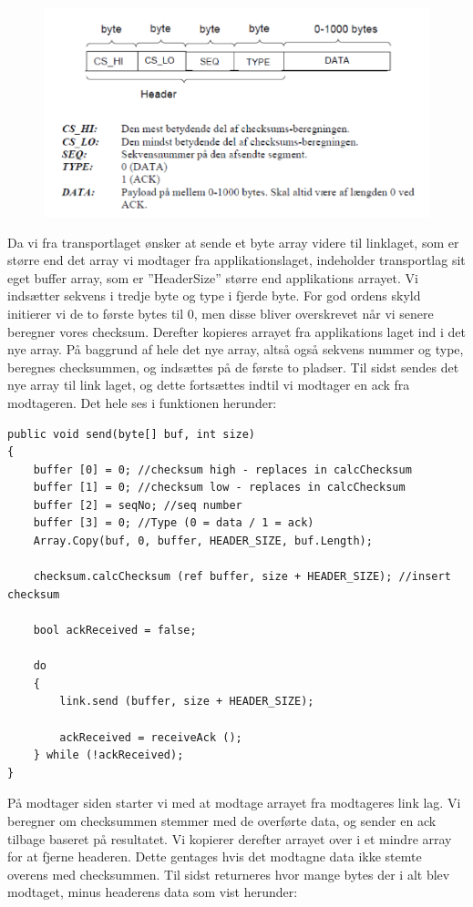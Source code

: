 \begin{figure}[h]
	\centering
	\includegraphics[width=0.7\linewidth]{figs/segment}
	\caption{}
	\label{fig:segment}
\end{figure}

Da vi fra transportlaget ønsker at sende et byte array videre til linklaget, som er større end det array vi
modtager fra applikationslaget, indeholder transportlag sit eget buffer array, som er ”HeaderSize” større
end applikations arrayet. Vi indsætter sekvens i tredje byte og type i fjerde byte. For god ordens skyld
initierer vi de to første bytes til 0, men disse bliver overskrevet når vi senere beregner vores checksum.
Derefter kopieres arrayet fra applikations laget ind i det nye array.
På baggrund af hele det nye array, altså også sekvens nummer og type, beregnes checksummen, og
indsættes på de første to pladser.
Til sidst sendes det nye array til link laget, og dette fortsættes indtil vi modtager en ack fra modtageren. Det
hele ses i funktionen herunder:

\begin{lstlisting}
public void send(byte[] buf, int size)
{
	buffer [0] = 0; //checksum high - replaces in calcChecksum
	buffer [1] = 0; //checksum low - replaces in calcChecksum
	buffer [2] = seqNo; //seq number
	buffer [3] = 0; //Type (0 = data / 1 = ack)
	Array.Copy(buf, 0, buffer, HEADER_SIZE, buf.Length);
	
	checksum.calcChecksum (ref buffer, size + HEADER_SIZE); //insert checksum
	
	bool ackReceived = false;
	
	do 
	{
		link.send (buffer, size + HEADER_SIZE);
		
		ackReceived = receiveAck ();
	} while (!ackReceived);
}
\end{lstlisting}

På modtager siden starter vi med at modtage arrayet fra modtageres link lag. Vi beregner om
checksummen stemmer med de overførte data, og sender en ack tilbage baseret på resultatet. Vi kopierer
derefter arrayet over i et mindre array for at fjerne headeren. Dette gentages hvis det modtagne data ikke
stemte overens med checksummen. Til sidst returneres hvor mange bytes der i alt blev modtaget, minus
headerens data som vist herunder:

